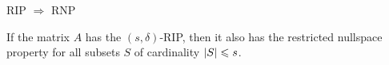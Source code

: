 \documentclass{beamer}
\begin{document}
\begin{frame}{RIP \(\Rightarrow\) RNP}
    \begin{theorem}
        If the matrix \(A\) has the \((s,\delta)\)-RIP, then it also has the restricted nullspace property for all subsets \(S\) of cardinality \(\left|S\right|\leqslant s\).
    \end{theorem}
\end{frame}
\end{document}
